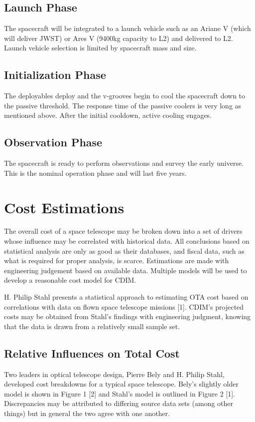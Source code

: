 \documentclass{ws-jai}
\begin{document}
\subsection{Launch Phase}
\label{sS:launch}
The spacecraft will be integrated to a launch vehicle such as an Ariane V (which will deliver JWST) or Ares V (9400kg capacity to L2) and delivered to L2.
Launch vehicle selection is limited by spacecraft mass and size.

\subsection{Initialization Phase}
\label{sS:initphase}
The deployables deploy and the v-grooves begin to cool the spacecraft down to the passive threshold.
The response time of the passive coolers is very long as mentioned above.
After the initial cooldown, active cooling engages.

\subsection{Observation Phase}
\label{sS:obsphase}
The spacecraft is ready to perform observations and survey the early universe.
This is the nominal operation phase and will last five years.

\section{Cost Estimations}
\label{S:cost}
The overall cost of a space telescope may be broken down into a set of drivers whose influence may be correlated with historical data.
All conclusions based on statistical analysis are only as good as their databases, and fiscal data, such as what is required for proper analysis, is scarce.
Estimations are made with engineering judgement based on available data. Multiple models will be used to develop a reasonable cost model for CDIM.\@

H. Philip Stahl presents a statistical approach to estimating OTA cost based on correlations with data on flown space telescope missions [1].
CDIM's projected costs may be obtained from Stahl's findings with engineering judgment, knowing that the data is drawn from a relatively small sample set.

\subsection{Relative Influences on Total Cost}
Two leaders in optical telescope design, Pierre Bely and H. Philip Stahl, developed cost breakdowns for a typical space telescope.
Bely's slightly older model is shown in Figure 1 [2] and Stahl's model is outlined in Figure 2 [1].
Discrepancies may be attributed to differing source data sets (among other things) but in general the two agree with one another.
\end{document}
